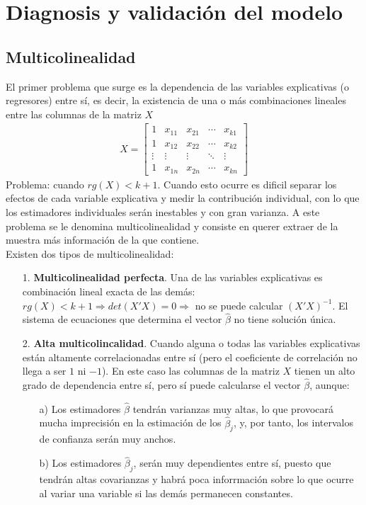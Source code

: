 \section{Diagnosis y validación del modelo}

\subsection{Multicolinealidad}
\noindent El primer problema que surge es la dependencia de las variables explicativas (o regresores) entre sí, es decir, la existencia de una o más combinaciones lineales entre las columnas de la matriz $X$
\begin{align*}
    X = \begin{bmatrix}
    1 & x_{11} & x_{21} & \cdots & x_{k1} \\
    1 & x_{12} & x_{22} & \cdots & x_{k2} \\
    \vdots & \vdots & \vdots & \ddots & \vdots \\
    1 & x_{1n} & x_{2n} & \cdots & x_{kn} 
    \end{bmatrix}
\end{align*}
Problema: cuando $rg(X) < k +1$. Cuando esto ocurre es dificil separar los efectos de cada variable explicativa y medir la contribución individual, con lo que los estimadores individuales serán inestables y con gran varianza. A este problema se le denomina multicolinealidad y consiste en querer extraer de la muestra más información de la que contiene.
\\
\newline
Existen dos tipos de multicolinealidad:
\begin{enumerate}
    \item[1.] \textbf{Multicolinealidad perfecta}. Una de las variables explicativas es combinación lineal exacta de las demás: $rg(X) < k+1 \Longrightarrow det(X'X) = 0 \Longrightarrow$ no se puede calcular $(X'X)^{-1}$. El sistema de ecuaciones que determina el vector $\widehat{\beta}$ no tiene solución única.
    \item[2.]\textbf{Alta multicolincalidad}. Cuando alguna o todas las variables explicativas están altamente correlacionadas entre sí (pero el coeficiente de correlación no llega a ser $1$ ni $-1$). En este caso las columnas de la matriz $X$ tienen un alto grado de dependencia entre sí, pero sí puede calcularse el vector $\widehat{\beta}$, aunque:
    \begin{enumerate}
        \item[a)] Los estimadores $\widehat{\beta}$ tendrán varianzas muy altas, lo que provocará mucha imprecisión en la estimación de los $\widehat{\beta}_j$, y, por tanto, los intervalos de confianza serán muy anchos.
        \item[b)] Los estimadores $\widehat{\beta}_j$, serán muy dependientes entre sí, puesto que tendrán altas covarianzas y habrá poca inforrmación sobre lo que ocurre al variar una variable si las demás permanecen constantes.
    \end{enumerate}
\end{enumerate}

